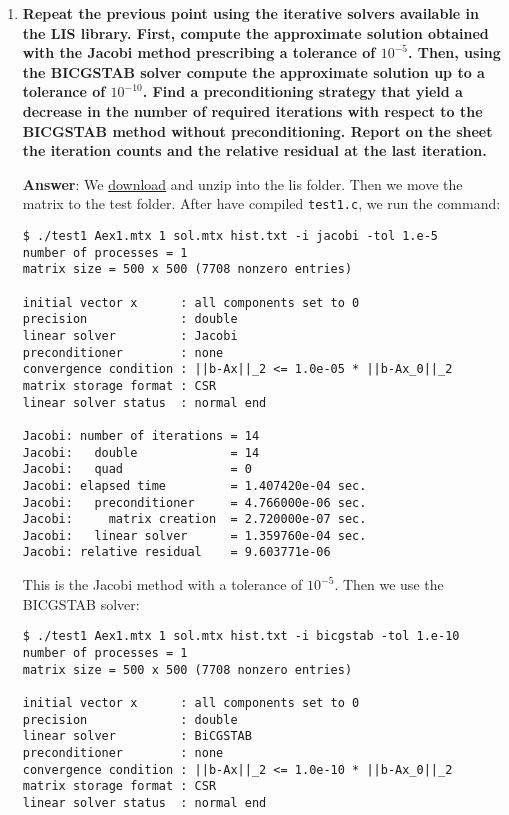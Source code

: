 \begin{enumerate}[label=\textcolor{Green3}{\textbf{\arabic*.}}]
    \newpage

    \item \textcolor{Green3}{\textbf{%
        Repeat the previous point using the iterative solvers available in the LIS library. First, compute the approximate solution obtained with the Jacobi method prescribing a tolerance of $10^{-5}$. Then, using the BICGSTAB solver compute the approximate solution up to a tolerance of $10^{-10}$. Find a preconditioning strategy that yield a decrease in the number of required iterations with respect to the BICGSTAB method without preconditioning. Report on the sheet the iteration counts and the relative residual at the last iteration.
    }}

    \textbf{Answer}:
    We \href{https://www.ssisc.org/lis/dl/lis-2.1.6.zip}{download} and unzip into the lis folder. Then we move the matrix to the test folder. After have compiled \texttt{test1.c}, we run the command:
    \begin{lstlisting}[mathescape=false]
$ ./test1 Aex1.mtx 1 sol.mtx hist.txt -i jacobi -tol 1.e-5
number of processes = 1
matrix size = 500 x 500 (7708 nonzero entries)

initial vector x      : all components set to 0
precision             : double
linear solver         : Jacobi
preconditioner        : none
convergence condition : ||b-Ax||_2 <= 1.0e-05 * ||b-Ax_0||_2
matrix storage format : CSR
linear solver status  : normal end

Jacobi: number of iterations = 14
Jacobi:   double             = 14
Jacobi:   quad               = 0
Jacobi: elapsed time         = 1.407420e-04 sec.
Jacobi:   preconditioner     = 4.766000e-06 sec.
Jacobi:     matrix creation  = 2.720000e-07 sec.
Jacobi:   linear solver      = 1.359760e-04 sec.
Jacobi: relative residual    = 9.603771e-06\end{lstlisting}
    This is the Jacobi method with a tolerance of $10^{-5}$. Then we use the BICGSTAB solver:
    \begin{lstlisting}[mathescape=false]
$ ./test1 Aex1.mtx 1 sol.mtx hist.txt -i bicgstab -tol 1.e-10
number of processes = 1
matrix size = 500 x 500 (7708 nonzero entries)

initial vector x      : all components set to 0
precision             : double
linear solver         : BiCGSTAB
preconditioner        : none
convergence condition : ||b-Ax||_2 <= 1.0e-10 * ||b-Ax_0||_2
matrix storage format : CSR
linear solver status  : normal end


\end{lstlisting}
\end{enumerate}
